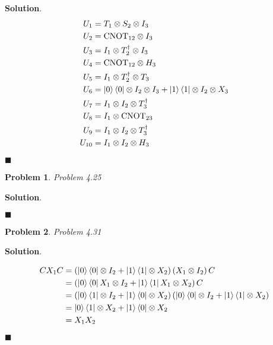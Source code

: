 \documentclass[12pt]{article}
\newtheorem{p}{Problem}
\theoremstyle{definition}
\newenvironment{s}{%
        \begin{trivlist} \item \textbf{Solution}. }{%
            \hspace*{\fill} $\blacksquare$\end{trivlist}}%
\begin{document}
{\begin{s}
\begin{align*}
U_{1} &= T_1 \otimes S_2 \otimes I_3\\
U_{2} &= \mathrm{CNOT}_{12}\otimes I_{3}\\
U_{3} &= I_{1} \otimes T_{2}^{\dagger} \otimes I_3\\
U_{4} &= \mathrm{CNOT}_{12}\otimes H_{3}\\
U_{5} &= I_1 \otimes T_{2}^{\dagger} \otimes T_3\\
U_{6} &= \ket{0}\bra{0}\otimes I_{2}\otimes I_{3} + \ket{1}\bra{1}\otimes I_{2}\otimes X_{3}\\
U_{7} &= I_1 \otimes I_2 \otimes T_3^{\dagger}\\
U_{8} &= I_{1}\otimes \mathrm{CNOT}_{23}\\
U_{9} &= I_1 \otimes I_2 \otimes T_3^{\dagger}\\
U_{10} &= I_1 \otimes I_2 \otimes H_3
\end{align*}



\end{s}

\begin{p}{Problem 4.25}

\end{p}

\begin{s}

\end{s}

\begin{p}{Problem 4.31}

\end{p}

\begin{s}

\begin{align*}
CX_{1}C &= \left(\ket{0}\bra{0} \otimes I_{2} + \ket{1}\bra{1}\otimes X_{2}\right)\left(X_{1}\otimes I_{2}\right) C\\
&= \left(\ket{0}\bra{0}X_{1} \otimes I_{2} + \ket{1}\bra{1}X_{1}\otimes X_{2}\right)C\\
&= \left(\ket{0}\bra{1} \otimes I_{2} + \ket{1}\bra{0}\otimes X_{2}\right)\left(\ket{0}\bra{0} \otimes I_{2} + \ket{1}\bra{1}\otimes X_{2}\right)\\
&= \ket{0}\bra{1}\otimes X_{2} + \ket{1}\bra{0} \otimes X_{2}\\
&= X_{1}X_{2}
\end{align*}

\end{s}
\end{document}
